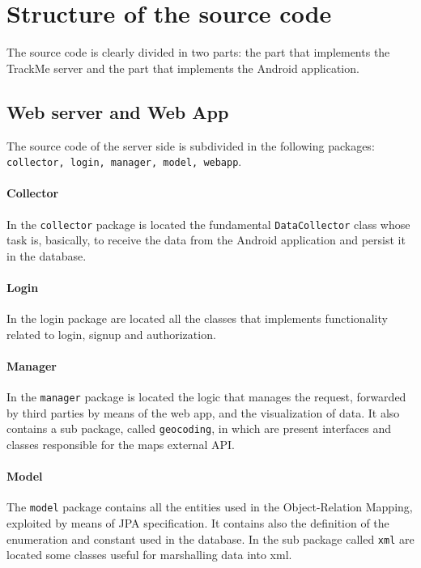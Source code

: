 \section{Structure of the source code}
The source code is clearly divided in two parts: the part that implements the TrackMe server and the part that implements the Android application.


\subsection{Web server and Web App}

The source code of the server side is subdivided in the following packages: \texttt{collector, login, manager, model, webapp}.

\paragraph{Collector}
In the \texttt{collector} package is located the fundamental \texttt{DataCollector} class whose task is, basically, to receive the data from the Android application and persist it in the database.

\paragraph{Login}
In the login package are located all the classes that implements functionality related to login, signup and authorization.

\paragraph{Manager}
In the \texttt{manager} package is located the logic that manages the request, forwarded by third parties by means of the web app, and the visualization of data.
It also contains a sub package, called \texttt{geocoding}, in which are present interfaces and classes responsible for the maps external API.

\paragraph{Model}
The \texttt{model} package contains all the entities used in the Object-Relation Mapping, exploited by means of JPA specification.
It contains also the definition of the enumeration and constant used in the database.
In the sub package called \texttt{xml} are located some classes useful for marshalling data into xml.


